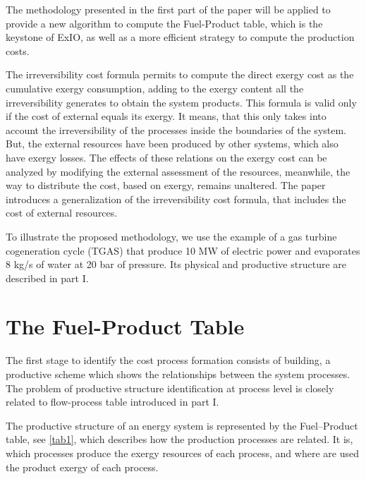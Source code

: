 \documentclass{ecos2018}
\begin{document}
The methodology presented in the first part of the paper will be applied to provide a new algorithm to compute the Fuel-Product table, which is the keystone of ExIO, as well as a more efficient strategy to compute the production costs.

The irreversibility cost formula \cite{Torres09} permits to compute the direct exergy cost as the cumulative exergy consumption, adding to the exergy content all the irreversibility generates to obtain the system products. This formula is valid only if the cost of external equals its exergy. It means, that this only takes into account the irreversibility of the processes inside the boundaries of the system. But, the external resources have been produced by other systems, which also have exergy losses. The effects of these relations on the exergy cost can be analyzed by modifying the external assessment of the resources, meanwhile, the way to distribute the cost, based on exergy, remains unaltered. The paper introduces a generalization of the irreversibility cost formula, that includes the cost of external resources.

To illustrate the proposed methodology, we use the example of a gas turbine cogeneration cycle (TGAS) that produce 10 MW of electric power and evaporates 8 kg/s of water at 20 bar of pressure. Its physical and productive structure are described in part I.
 
\section{The Fuel-Product Table}
The first stage to identify the cost process formation consists of building, a productive scheme which shows the relationships between the system processes. The problem of productive structure identification at process level is closely related to flow-process table introduced in part I. 

The productive structure of an energy system is represented by the Fuel--Product table, see \cref{tab1}, which describes how the production processes are related. It is, which processes produce the exergy resources of each process, and where are used the product exergy of each process. 
\end{document}
